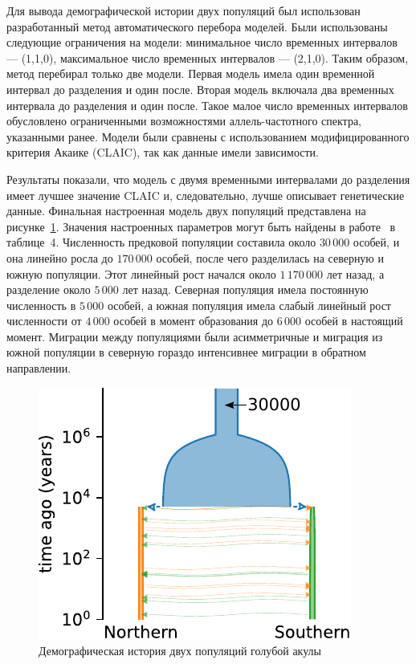 Для вывода демографической истории двух популяций был использован разработанный метод автоматического перебора моделей.
Были использованы следующие ограничения на модели: минимальное число временных интервалов --- (1,1,0), максимальное число временных интервалов --- (2,1,0).
Таким образом, метод перебирал только две модели.
Первая модель имела один временной интервал до разделения и один после.
Вторая модель включала два временных интервала до разделения и один после.
Такое малое число временных интервалов обусловлено ограниченными возможностями аллель-частотного спектра, указанными ранее.
Модели были сравнены с использованием модифицированного критерия Акаике (CLAIC), так как данные имели зависимости.

Результаты показали, что модель с двумя временными интервалами до разделения имеет лучшее значение CLAIC и, следовательно, лучше описывает генетические данные.
Финальная настроенная модель двух популяций представлена на рисунке~\ref{fig:part2:experiments:blue_shark:2pop_hist}.
Значения настроенных параметров могут быть найдены в работе~\cite{nikolic2022stepping} в таблице~4.
Численность предковой популяции составила около $30{\,}000$  особей, и она линейно росла до $170{\,}000$ особей, после чего разделилась на северную и южную популяции.
Этот линейный рост начался около $1{\,}170{\,}000$ лет назад, а разделение около $5{\,}000$ лет назад.
Северная популяция имела постоянную численность в $5{\,}000$ особей, а южная популяция имела слабый линейный рост численности от $4{\,}000$ особей в момент образования до $6{\,}000$ особей в настоящий момент.
Миграции между популяциями были асимметричные и миграция из южной популяции в северную гораздо интенсивнее миграции в обратном направлении.

\begin{figure}[ht]
    \centering
        \includegraphics[width=0.4\linewidth]{images_experiments/blue_shark/2pop_history.pdf}
    \caption{Демографическая история двух популяций голубой акулы}
    \label{fig:part2:experiments:blue_shark:2pop_hist}
\end{figure}

